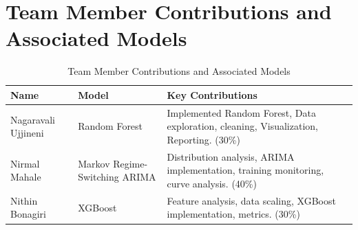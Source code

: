 \documentclass[conference]{IEEEtran}
\begin{document}
\section*{Team Member Contributions and Associated Models}
\begin{table}[htbp]
\caption{Team Member Contributions and Associated Models}
\begin{center}
\small
\begin{tabularx}{\linewidth}{|p{2.8cm}|p{2.8cm}|X|}
\hline
\textbf{Name} & \textbf{Model} & \textbf{Key Contributions} \\
\hline
Nagaravali Ujjineni & Random Forest & Implemented Random Forest, Data exploration, cleaning, Visualization, Reporting. (30\%) \\
\hline
Nirmal Mahale & Markov Regime-Switching ARIMA & Distribution analysis, ARIMA implementation, training monitoring, curve analysis. (40\%) \\
\hline
Nithin Bonagiri & XGBoost & Feature analysis, data scaling, XGBoost implementation, metrics. (30\%) \\
\hline
\end{tabularx}
\end{center}
\label{tab:contributions}
\end{table}
\end{document}
